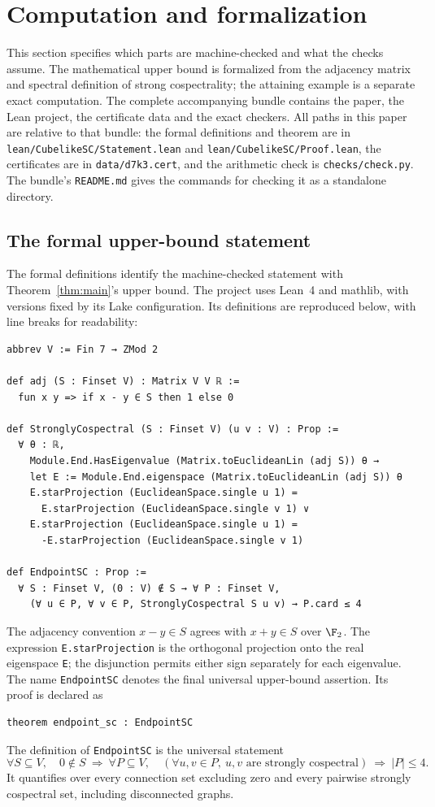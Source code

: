 \section{Computation and formalization}\label{sec:formal}
This section specifies which parts are machine-checked and what the
checks assume. The mathematical upper bound is formalized from the
adjacency matrix and spectral definition of strong cospectrality;
the attaining example is a separate exact computation.
The complete accompanying bundle contains the paper, the Lean project,
the certificate data and the exact checkers. All paths in this paper
are relative to that bundle: the formal definitions and theorem are
in \texttt{lean/CubelikeSC/Statement.lean} and
\texttt{lean/CubelikeSC/Proof.lean}, the certificates are in
\texttt{data/d7k3.cert}, and the arithmetic check is
\texttt{checks/check.py}. The bundle's \texttt{README.md} gives the
commands for checking it as a standalone directory.

\subsection{The formal upper-bound statement}
The formal definitions identify the machine-checked statement with
Theorem~\ref{thm:main}'s upper bound. The project uses Lean~4 and
mathlib, with versions fixed by its Lake configuration. Its definitions
are reproduced below, with line breaks for readability:
\begin{lstlisting}
abbrev V := Fin 7 → ZMod 2

def adj (S : Finset V) : Matrix V V ℝ :=
  fun x y => if x - y ∈ S then 1 else 0

def StronglyCospectral (S : Finset V) (u v : V) : Prop :=
  ∀ θ : ℝ,
    Module.End.HasEigenvalue (Matrix.toEuclideanLin (adj S)) θ →
    let E := Module.End.eigenspace (Matrix.toEuclideanLin (adj S)) θ
    E.starProjection (EuclideanSpace.single u 1) =
      E.starProjection (EuclideanSpace.single v 1) ∨
    E.starProjection (EuclideanSpace.single u 1) =
      -E.starProjection (EuclideanSpace.single v 1)

def EndpointSC : Prop :=
  ∀ S : Finset V, (0 : V) ∉ S → ∀ P : Finset V,
    (∀ u ∈ P, ∀ v ∈ P, StronglyCospectral S u v) → P.card ≤ 4
\end{lstlisting}
The adjacency convention $x-y\in S$ agrees with $x+y\in S$ over
$\F_2$. The expression \texttt{E.starProjection} is the orthogonal
projection onto the real eigenspace \texttt{E}; the disjunction permits
either sign separately for each eigenvalue.
The name \texttt{EndpointSC} denotes the final universal upper-bound
assertion. Its proof is declared as
\begin{verbatim}
theorem endpoint_sc : EndpointSC
\end{verbatim}
The definition of \texttt{EndpointSC} is the universal statement
\[
 \forall S\subseteq V,\quad 0\notin S\ \Longrightarrow\
 \forall P\subseteq V,\quad
 (\forall u,v\in P,\ u,v\text{ are strongly cospectral})
 \ \Longrightarrow\ |P|\leq4.
\]
It quantifies over every connection set excluding zero and every
pairwise strongly cospectral set, including disconnected graphs.

